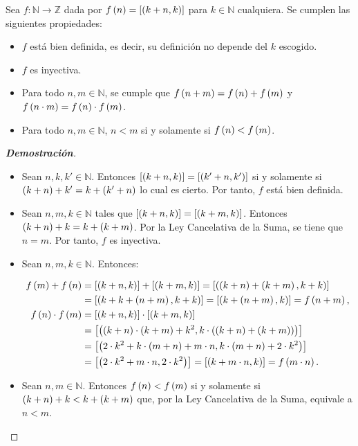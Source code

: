 \begin{proposition}
  \rm Sea $f:\mathbb{N}\rightarrow\mathbb{Z}$ dada por $f\left(n\right)=\left[\left(k+n,k\right)\right]$ para $k\in\mathbb{N}$ cualquiera. Se cumplen las siguientes propiedades:

  \begin{itemize}
    \item[1.] $f$ está bien definida, es decir, su definición no depende del $k$ escogido.
    \item[2.] $f$ es inyectiva.
    \item[3.] Para todo $n,m\in\mathbb{N}$, se cumple que $f\left(n+m\right)=f\left(n\right)+f\left(m\right)$ y $f\left(n\cdot m\right)=f\left(n\right)\cdot f\left(m\right)$.
    \item[4.] Para todo $n,m\in\mathbb{N}$, $n<m$ si y solamente si $f\left(n\right)<f\left(m\right)$. 
  \end{itemize}
  \begin{proof}[\rm\textbf{Demostración}]
    \hfill
    \begin{itemize}
      \item[1.] Sean $n,k,k'\in\mathbb{N}$. Entonces $\left[\left(k+n,k\right)\right]=\left[\left(k'+n,k'\right)\right]$ si y solamente si $\left(k+n\right)+k'=k+\left(k'+n\right)$ lo cual es cierto. Por tanto, $f$ está bien definida.
      \item[2.] Sean $n,m,k\in\mathbb{N}$ tales que $\left[\left(k+n,k\right)\right]=\left[\left(k+m,k\right)\right]$. Entonces $\left(k+n\right)+k=k+\left(k+m\right)$. Por la Ley Cancelativa de la Suma, se tiene que $n=m$. Por tanto, $f$ es inyectiva.
      \item[3.] Sean $n,m,k\in\mathbb{N}$. Entonces:
      
      \begin{equation}
        \begin{split}
          f\left(m\right)+f\left(n\right) & =\left[\left(k+n,k\right)\right]+\left[\left(k+m,k\right)\right]=\left[\left(\left(k+n\right)+\left(k+m\right),k+k\right)\right]\\
          & =\left[\left(k+k+\left(n+m\right),k+k\right)\right]=\left[\left(k+\left(n+m\right),k\right)\right]=f\left(n+m\right),\\
          f\left(n\right)\cdot f\left(m\right) &= \left[\left(k+n,k\right)\right]\cdot\left[\left(k+m,k\right)\right]\\
          & =\left[\left(\left(k+n\right)\cdot\left(k+m\right)+k^2,k\cdot\left(\left(k+n\right)+\left(k+m\right)\right)\right)\right]\\
          & =\left[\left(2\cdot k^2+k\cdot\left(m+n\right)+m\cdot n,k\cdot\left(m+n\right)+2\cdot k^2\right)\right]\\
          & =\left[\left(2\cdot k^2+m\cdot n,2\cdot k^2\right)\right]=\left[\left(k+m\cdot n,k\right)\right]=f\left(m\cdot n\right).
        \end{split}
      \end{equation}
      \item[4.] Sean $n,m\in\mathbb{N}$. Entonces $f\left(n\right)<f\left(m\right)$ si y solamente si $\left(k+n\right)+k<k+\left(k+m\right)$ que, por la Ley Cancelativa de la Suma, equivale a $n<m$.
    \end{itemize}
  \end{proof}
\end{proposition}

